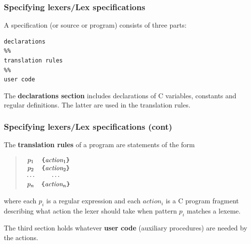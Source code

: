 %
\begin{frame}[containsverbatim]
\frametitle{Specifying lexers/Lex specifications}

A \Lex specification (or source or program) consists of three parts:
{\small
\begin{verbatim}
declarations
%%
translation rules
%%
user code
\end{verbatim}
}
The \textbf{declarations section} includes declarations of C
variables, constants and regular definitions. The latter are used in
the translation rules.

\end{frame}

%
\begin{frame}[containsverbatim]
\frametitle{Specifying lexers/Lex specifications (cont)}

The \textbf{translation rules} of a \Lex program are statements of
the form
\begin{quote}
\(
\begin{array}{cc}
p_1 & \verb+{+ \textit{action}_1 \verb+}+\\
p_2 & \verb+{+ \textit{action}_2 \verb+}+\\
\cdots & \cdots\\
p_n & \verb+{+ \textit{action}_n \verb+}+
\end{array}
\)
\end{quote}
where each \(p_i\) is a regular expression and each
\(\textit{action}_i\) is a C program fragment describing what action
the lexer should take when pattern \(p_i\) matches a lexeme.

\bigskip

The third section holds whatever \textbf{user code} (auxiliary
procedures) are needed by the actions.

\end{frame}

